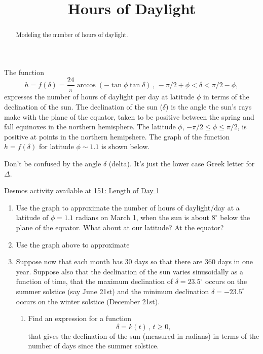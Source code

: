 \documentclass{ximera}
\title{Hours of Daylight}
\begin{document}
\begin{abstract}
Modeling the number of hours of daylight.
\end{abstract}
\maketitle


\begin{question}  \label{Qdf4ppp3455}
The function
\[
    h = f(\delta) = \frac{24}{\pi} \arccos(-\tan\phi \tan\delta) \, , \, -\pi/2+\phi < \delta < \pi/2-\phi ,
\]
expresses the number of hours of daylight per day at latitude $\phi$ in terms of the declination of the sun. The declination of the sun ($\delta$) is the angle the sun's rays make with the plane of the equator, taken to be positive between the spring and fall equinoxes in the northern hemisphere. The latitude $\phi$, $-\pi/2 \leq \phi \leq \pi/2$, is positive at points in the northern hemipshere. The graph of the function $h=f(\delta)$ for latitude $\phi\sim 1.1$ is shown below.

Don't be confused by the angle $\delta$ (delta). It's just the lower case Greek letter for $\Delta$.

\begin{onlineOnly}
    \begin{center}
\end{center}
\end{onlineOnly}

Desmos activity available at \href{https://www.desmos.com/calculator/ifomatkcta}{151: Length of Day 1}

\begin{enumerate}
\item Use the graph to approximate the number of hours of daylight/day at a latitude of $\phi=1.1$ radians on March 1, when the sun is about $8^\circ$ below the plane of the equator. What about at our latitude? At the equator?

\item Use the graph above to approximate

\item Suppose now that each month has 30 days so that there are 360 days in one year. Suppose also that the declination of the sun varies sinusoidally as a function of time, that the maximum declination of $\delta = 23.5^\circ$ occurs on the summer solstice (say June 21st) and the minimum declination $\delta = -23.5^\circ$ occurs on the winter solstice (December 21st). 

\begin{enumerate}
\item Find an expression for a function
\[
     \delta = k(t) \, , \, t\geq 0,
\]
that gives the declination of the sun (measured in radians) in terms of the number of days since the summer solstice. 

\
\end{enumerate}
\end{enumerate}


\end{question}
\end{document}
